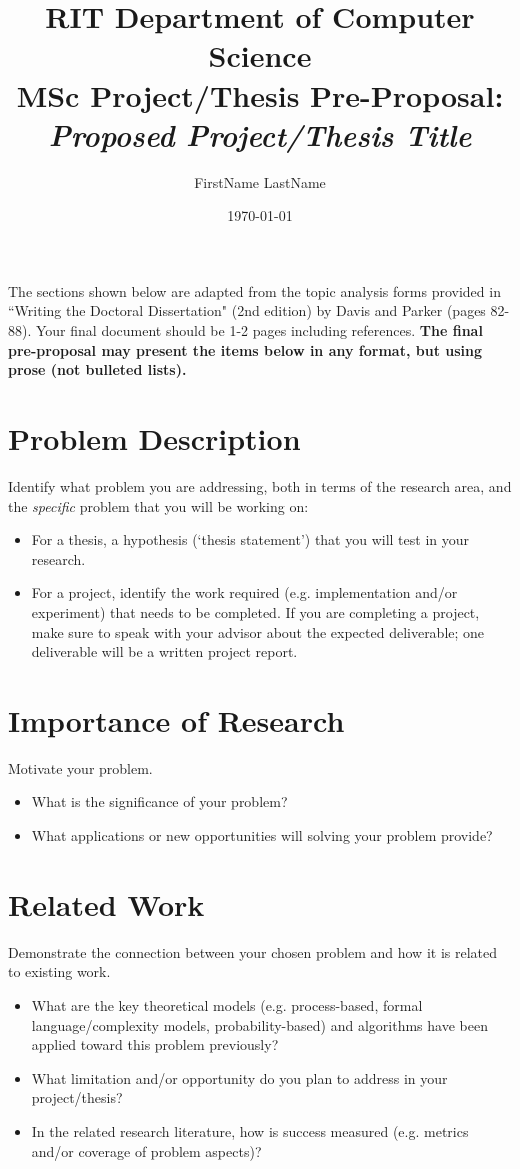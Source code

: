 \documentclass[11pt]{artikel3}
\title{RIT Department of Computer Science\\MSc Project/Thesis Pre-Proposal:\\\emph{Proposed Project/Thesis Title}}
\author{FirstName LastName}
\date{\today}
\begin{document}
\maketitle

The sections shown below are adapted from the topic analysis forms provided in ``Writing the Doctoral Dissertation" (2nd edition) by Davis and Parker (pages 82-88). Your final document should be 1-2 pages including references. {\bf The final pre-proposal may present the items below in any format, but using prose (not bulleted lists).} 

\section{Problem Description}
Identify what problem you are addressing, both in terms of the research area, and the \emph{specific} problem that you will be working on:
\begin{itemize}
	\item For a thesis, a hypothesis (`thesis statement') that you will test in your research.
	\item For a project, identify the work required (e.g. implementation and/or experiment) that needs to be completed. If you are completing a project, make sure to speak with your advisor about the expected deliverable; one deliverable will be a written project report.
\end{itemize}

\section{Importance of Research}
Motivate your problem. 
\begin{itemize}
	\item What is the significance of your problem? 
	\item What applications or new opportunities will solving your problem provide?
\end{itemize}

\section{Related Work}

Demonstrate the connection between your chosen problem and how it is related to existing work. 
\begin{itemize}
	\item What are the key theoretical models (e.g. process-based, formal language/complexity models, probability-based) and algorithms have been applied toward this problem previously? 
	\item What limitation and/or opportunity do you plan to address in your project/thesis?
	\item
In the related research literature, how is success measured (e.g. metrics and/or coverage of problem aspects)?
\end{itemize}
\end{document}
